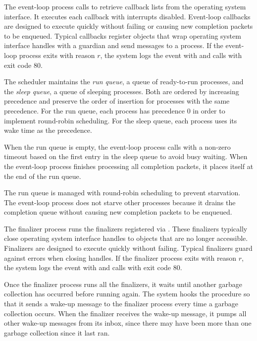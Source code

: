 The event-loop process calls  to retrieve
callback lists from the operating system interface.  It executes each
callback with interrupts disabled.  Event-loop callbacks are designed
to execute quickly without failing or causing new completion packets
to be enqueued. Typical callbacks register objects that wrap operating
system interface handles with a guardian and send messages to a
process. If the event-loop process exits with reason $r$, the system
logs the event  with
 and calls  with exit code
80.

The scheduler maintains the \emph{run queue}, a queue
of ready-to-run processes, and the \emph{sleep queue}, a queue of sleeping processes. Both are ordered by
increasing precedence and preserve the order of insertion for
processes with the same precedence. For the run queue, each process
has precedence 0 in order to implement round-robin scheduling. For the
sleep queue, each process uses its wake time as the precedence.

When the run queue is empty, the event-loop process calls
 with a non-zero timeout based on the first
entry in the sleep queue to avoid busy waiting. When the event-loop
process finishes processing all completion packets, it places itself
at the end of the run queue.

  \mitigation The
run queue is managed with round-robin scheduling to prevent
starvation. The event-loop process does not starve other processes
because it drains the completion queue without causing new completion
packets to be enqueued.

The finalizer process\label{finalizer-process} runs the finalizers
registered via . These finalizers typically close
operating system interface handles to objects that are no longer
accessible.   \mitigation Finalizers are designed to execute
quickly without failing. Typical finalizers guard against errors when
closing handles. If the finalizer process exits with reason $r$, the
system logs the event  with
 and calls  with exit code
80.

Once the finalizer process runs all the finalizers, it waits until
another garbage collection has occurred before running again. The
system hooks the  procedure so that
it sends a wake-up message to the finalizer process every time a
garbage collection occurs.  When the finalizer receives the wake-up
message, it pumps all other wake-up messages from its inbox, since
there may have been more than one garbage collection since it last
ran.

